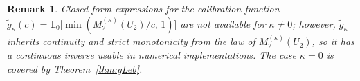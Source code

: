 \documentclass{article}%
\newtheorem{corollary}[theorem]{Corollary}
\newtheorem{remark}[theorem]{Remark}
\newcommand{\E}{\mathbb{E}}
\begin{document}
\begin{remark}
Closed-form expressions for the calibration function
\(\widetilde g_\kappa(c)=\E_0\bigl[\min(M_2^{(\kappa)}(U_2)/c,\,1)\bigr]\)
are not available for \(\kappa\neq 0\); however,
\(\widetilde g_\kappa\) inherits continuity and strict monotonicity
from the law of \(M_2^{(\kappa)}(U_2)\), so it has a continuous
inverse usable in numerical implementations. The case \(\kappa=0\) is
covered by Theorem~\ref{thm:gLeb}.
\end{remark}


\end{document}
